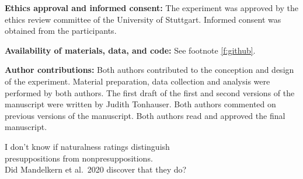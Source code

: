 \documentclass[11pt,fleqn]{article}
\newcommand{\6}{\mbox{$[\hspace*{-.6mm}[$}}
\newcommand{\9}{\mbox{$]\hspace*{-.6mm}]$}}
\newcommand{\citepos}[1]{\citeauthor{#1}'s \citeyear{#1}}
\begin{document}
\bigskip

\noindent
{\bf Ethics approval and informed consent:} The experiment was approved by the ethics review committee of the University of Stuttgart. Informed consent was obtained from the participants.

\bigskip

\noindent
{\bf Availability of materials, data, and code:} See footnote \ref{f:github}.

\bigskip

\noindent
{\bf Author contributions:} Both authors contributed to the conception and design of the experiment. Material preparation, data collection and analysis were performed by both authors. The first draft of the first and second versions of the manuscript were written by Judith Tonhauser. Both authors commented on previous versions of the manuscript. Both authors read and approved the final manuscript.

\newpage

\clearpage
{}	

\begin{center}
{\LARGE I don't know if naturalness ratings distinguish \\ presuppositions from nonpresuppositions. \\[0.15cm] Did Mandelkern et al.\ 2020 discover that they do?}
\end{center}

\begin{abstract}

Presuppositions have long been taken to be a well-defined class of content that is characterized by typically projecting and by being conventionally associated with particular lexical items or constructions (e.g., \citealt{heim83,vds92,mandelkern-etal2020,presupposition-sep}). While the strength of the projection inference is often taken to distinguish presuppositions from nonpresuppositions, experimental investigations that used inference tasks suggested that the strength of the projection inference does not distinguish the two (e.g., \citealt{demarneffe-etal-sub23,tbd-variability,degen-tonhauser-language}). \citealt{mandelkern-etal2020} proposed that a different measure, namely comparison of naturalness ratings in explicit ignorance and support contexts, distinguishes presuppositions from nonpresuppositions. This paper presents the results of an experiment designed to investigate \citepos{mandelkern-etal2020} proposal in the domain of factive and nonfactive clause-embedding predicates. The results do not support \citepos{mandelkern-etal2020} proposal, which means that the question of how presuppositional projection inferences can be distinguished from nonpresuppositional ones is still open.

\end{abstract}
		
\end{document}
